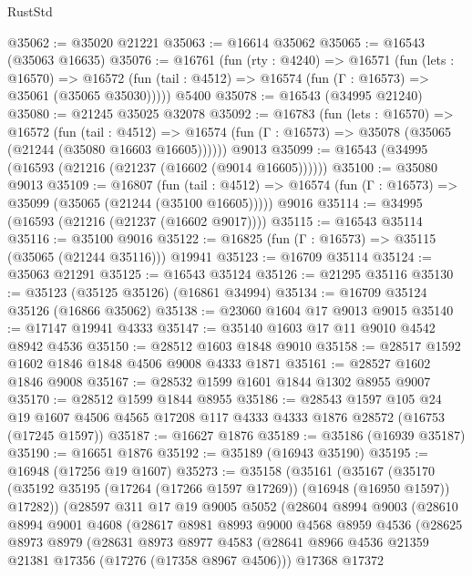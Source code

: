 \begin{lexlean}{RustStd}
\begin{coremodule}
@35062 := @35020 @21221
@35063 := @16614 @35062
@35065 := @16543 (@35063 @16635)
@35076 := @16761
    (fun (rty : @4240) =>
    @16571
      (fun (lets : @16570) =>
      @16572 (fun (tail : @4512) => @16574 (fun (Γ : @16573) => @35061 (@35065 @35030)))))
    @5400
@35078 := @16543 (@34995 @21240)
@35080 := @21245 @35025 @32078
@35092 := @16783
    (fun (lets : @16570) =>
    @16572
      (fun (tail : @4512) =>
      @16574 (fun (Γ : @16573) => @35078 (@35065 (@21244 (@35080 @16603 @16605))))))
    @9013
@35099 := @16543 (@34995 (@16593 (@21216 (@21237 (@16602 (@9014 @16605))))))
@35100 := @35080 @9013
@35109 := @16807
    (fun (tail : @4512) => @16574 (fun (Γ : @16573) => @35099 (@35065 (@21244 (@35100 @16605)))))
    @9016
@35114 := @34995 (@16593 (@21216 (@21237 (@16602 @9017))))
@35115 := @16543 @35114
@35116 := @35100 @9016
@35122 := @16825 (fun (Γ : @16573) => @35115 (@35065 (@21244 @35116))) @19941
@35123 := @16709 @35114
@35124 := @35063 @21291
@35125 := @16543 @35124
@35126 := @21295 @35116
@35130 := @35123 (@35125 @35126) (@16861 @34994)
@35134 := @16709 @35124 @35126 (@16866 @35062)
@35138 := @23060 @1604 @17 @9013 @9015
@35140 := @17147 @19941 @4333
@35147 := @35140 @1603 @17 @11 @9010 @4542 @8942 @4536
@35150 := @28512 @1603 @1848 @9010
@35158 := @28517 @1592 @1602 @1846 @1848 @4506 @9008 @4333 @1871
@35161 := @28527 @1602 @1846 @9008
@35167 := @28532 @1599 @1601 @1844 @1302 @8955 @9007
@35170 := @28512 @1599 @1844 @8955
@35186 := @28543
    @1597
    @105
    @24
    @19
    @1607
    @4506
    @4565
    @17208
    @117
    @4333
    @4333
    @1876
    @28572
    (@16753 (@17245 @1597))
@35187 := @16627 @1876
@35189 := @35186 (@16939 @35187)
@35190 := @16651 @1876
@35192 := @35189 (@16943 @35190)
@35195 := @16948 (@17256 @19 @1607)
@35273 := @35158
    (@35161
      (@35167
        (@35170 (@35192 @35195 (@17264 (@17266 @1597 @17269)) (@16948 (@16950 @1597)) @17282))
        (@28597
          @311
          @17
          @19
          @9005
          @5052
          (@28604
            @8994
            @9003
            (@28610
              @8994
              @9001
              @4608
              (@28617
                @8981
                @8993
                @9000
                @4568
                @8959
                @4536
                (@28625
                  @8973
                  @8979
                  (@28631
                    @8973
                    @8977
                    @4583
                    (@28641 @8966 @4536 @21359 @21381 @17356 (@17276 (@17358 @8967 @4506)))
                    @17368
                    @17372

\end{coremodule}
\end{lexlean}
